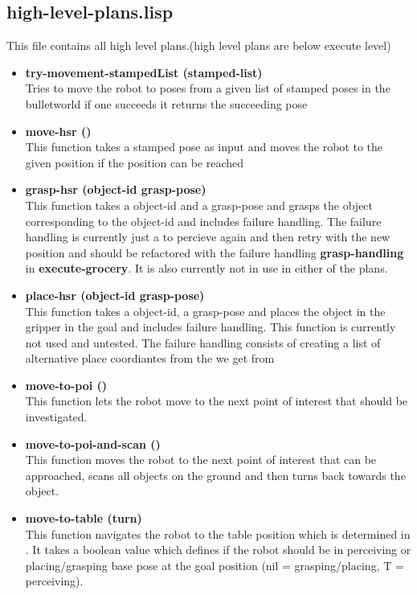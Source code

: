 \documentclass[main.tex]{subfiles}
\begin{document}
	    \subsection{high-level-plans.lisp}
	    \label{high-level}
	    This file contains all high level plans.(high level plans are below execute level)
	    \begin{itemize}
		\item \textbf{try-movement-stampedList (stamped-list)} \\
		Tries to move the robot to poses from a given list of stamped poses in the bulletworld if one succeeds it returns the succeeding pose 
	    \item \textbf{move-hsr ()} \\
	    This function takes a stamped pose as input and moves the robot to the given position if the position can be reached
	    \item \textbf{grasp-hsr (object-id grasp-pose)} \\
	    This function takes a object-id and a grasp-pose and grasps the object corresponding to the object-id and includes failure handling. The failure handling is currently just a to percieve again and then retry with the new position and should be refactored with the failure handling \textbf{grasp-handling} in \textbf{execute-grocery}.
	    It is also currently not in use in either of the plans.
	    \item \textbf{place-hsr (object-id grasp-pose)} \\
	    This function takes a object-id, a grasp-pose and places the object in the gripper in the goal and includes failure handling. This function is currently not used and untested. The failure handling consists of creating a list of alternative place coordiantes from the we get from 
	    \item \textbf{move-to-poi ()} \\
	    This function lets the robot move to the next point of interest that should be investigated. 
	    \item \textbf{move-to-poi-and-scan ()} \\
	    This function moves the robot to the next point of interest that can be approached, scans all objects on the ground and then turns back towards the object.
	    \item \textbf{move-to-table (turn)} \\
	    This function navigates the robot to the table position which is determined in . It takes a boolean value which defines if the robot should be in perceiving or placing/grasping base pose at the goal position (nil = grasping/placing, T = perceiving). 

\end{itemize}
\end{document}
